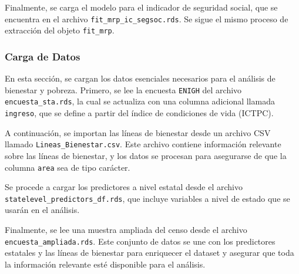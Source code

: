 \documentclass[
  12pt,
]{book}
\newenvironment{Shaded}{\begin{snugshade}}{\end{snugshade}}
\newcommand{\FunctionTok}[1]{\textcolor[rgb]{0.13,0.29,0.53}{\textbf{#1}}}
\newcommand{\NormalTok}[1]{#1}
\newcommand{\OtherTok}[1]{\textcolor[rgb]{0.56,0.35,0.01}{#1}}
\newcommand{\SpecialCharTok}[1]{\textcolor[rgb]{0.81,0.36,0.00}{\textbf{#1}}}
\newcommand{\StringTok}[1]{\textcolor[rgb]{0.31,0.60,0.02}{#1}}
\begin{document}
Finalmente, se carga el modelo para el indicador de seguridad social, que se encuentra en el archivo \texttt{fit\_mrp\_ic\_segsoc.rds}. Se sigue el mismo proceso de extracción del objeto \texttt{fit\_mrp}.

\begin{Shaded}
\end{Shaded}

\hypertarget{carga-de-datos-3}{%
\subsubsection*{Carga de Datos}\label{carga-de-datos-3}}

En esta sección, se cargan los datos esenciales necesarios para el análisis de bienestar y pobreza. Primero, se lee la encuesta \texttt{ENIGH} del archivo \texttt{encuesta\_sta.rds}, la cual se actualiza con una columna adicional llamada \texttt{ingreso}, que se define a partir del índice de condiciones de vida (ICTPC).

A continuación, se importan las líneas de bienestar desde un archivo CSV llamado \texttt{Lineas\_Bienestar.csv}. Este archivo contiene información relevante sobre las líneas de bienestar, y los datos se procesan para asegurarse de que la columna \texttt{area} sea de tipo carácter.

Se procede a cargar los predictores a nivel estatal desde el archivo \texttt{statelevel\_predictors\_df.rds}, que incluye variables a nivel de estado que se usarán en el análisis.

Finalmente, se lee una muestra ampliada del censo desde el archivo \texttt{encuesta\_ampliada.rds}. Este conjunto de datos se une con los predictores estatales y las líneas de bienestar para enriquecer el dataset y asegurar que toda la información relevante esté disponible para el análisis.
\end{document}
